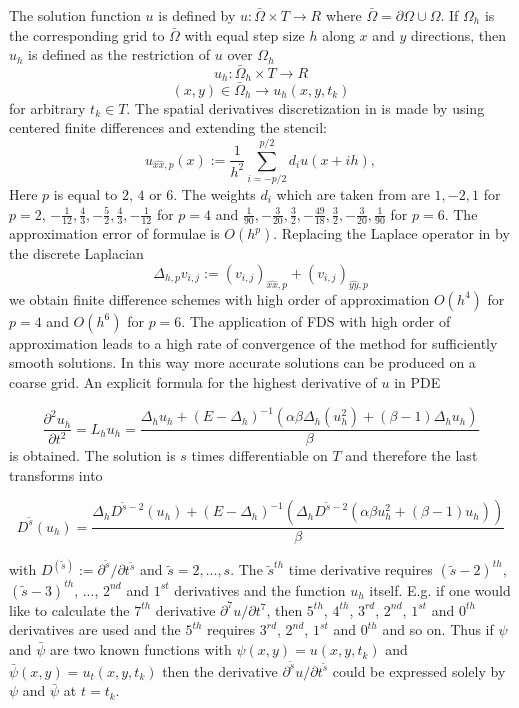 \documentclass[11pt,a4paper,twoside]{article}
\begin{document}
The solution function $u$ is defined by $u : \bar \Omega \times T \rightarrow  R$ where $\bar \Omega = \partial \Omega \cup \Omega$. If $\Omega_h$ is the corresponding grid to $\bar \Omega$ with equal step size $h$ along $x$ and $y$ directions, then $u_h$ is defined as the restriction of $u$ over $\Omega_h$
$$u_h : \bar \Omega_h \times T \rightarrow  R$$
$$ (x,y) \in \bar \Omega_h \rightarrow u_h(x,y, t_k)$$
for arbitrary $t_k \in T$. The spatial derivatives discretization in  is made by using centered finite differences and extending the stencil:
\begin{equation}\label{fd}
u_{\widehat{xx},p}(x) :=  \frac{1}{h^2} \sum\limits_{i=-p/2}^{p/2} d_i u(x+ih),
\end{equation}
 Here $p$ is equal to $2$, $4$ or $6$.  The weights $d_i$ which are taken from \cite{forn} are  
 $ 1,-2,1$ for $p=2$, $-\frac{1}{12}, \frac{4}{3}, -\frac{5}{2}, \frac{4}{3}, -\frac{1}{12}$ for $p=4$ and  $\frac{1}{90}, -\frac{3}{20}, \frac{3}{2}, -\frac{49}{18}, \frac{3}{2}, -\frac{3}{20}, \frac{1}{90}$ for $p=6$. The approximation error of  formulae  is $O(h^p)$. Replacing the Laplace operator in  by the discrete Laplacian 
$$ \Delta_{h,p} v_{i,j} := (v_{i,j})_{\widehat{xx},p} + (v_{i,j})_{\widehat{yy},p}$$ 
we obtain finite difference schemes with high order of approximation $O(h^4)$ for $p=4$ and  $O(h^6)$ for $p=6 $.  The application of FDS with high order of approximation leads to a high rate of convergence of the method for sufficiently smooth solutions. In this way more accurate solutions can be produced on a coarse grid. An explicit formula for the highest derivative of $u$ in PDE  

\begin{equation}\label{Leq}
\frac{ \partial^2 u_h }{ \partial t^2 } = L_h u_h = \frac{ \Delta_h u_h + (E - \Delta_h)^{-1} ( \alpha \beta \Delta_h( u_h^2) + (\beta -1)\Delta_h u_h) }{\beta}
\end{equation}
is obtained. The solution is $s$ times differentiable on $T$ and therefore the last transforms into

\begin{equation}\label{DLeq}
D^{\tilde s} (u_h) =\frac{ \Delta_h D^{\tilde s - 2}(u_h) + (E - \Delta_h)^{-1}( \Delta_h D^{\tilde s - 2} ( \alpha \beta u_h^2  + (\beta -1)u_h) )  }{\beta} 
\end{equation}

with $D^{(\tilde s)} := \partial^{\tilde s} / \partial t^{\tilde s}$ and $\tilde s = 2,...,s$. The $\tilde s^{th}$ time derivative requires $(\tilde s-2)^{th}$, $(\tilde s-3)^{th}$, ..., $2^{nd}$ and $1^{st}$ derivatives and the function $u_h$ itself. E.g. if one would like to calculate the $7^{th}$ derivative $\partial^7 u / \partial t^7$, then $5^{th}$, $4^{th}$, $3^{rd}$, $2^{nd}$, $1^{st}$ and $0^{th}$ derivatives are used and the $5^{th}$ requires  $3^{rd}$, $2^{nd}$, $1^{st}$ and $0^{th}$ and so on.  Thus if $\psi$ and $\bar \psi$ are two known functions with $\psi(x,y) = u(x,y, t_k)$ and $\bar \psi(x,y) = u_t(x,y, t_k)$ then the derivative $\partial^{\tilde s} u / \partial t^{\tilde s}$ could be expressed solely by $\psi$ and $\bar \psi$ at $t = t_k$.
\end{document}
